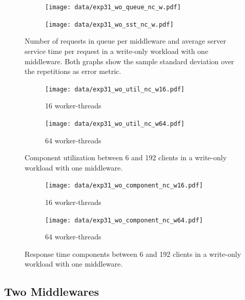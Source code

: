 \documentclass[11pt,a4paper]{article}
\begin{document}
\begin{figure}
	\begin{subfigure}[b]{.499\linewidth}
		\centering
		\texttt{[image: data/exp31\_wo\_queue\_nc\_w.pdf]}
	\end{subfigure}\hfill
	\begin{subfigure}[b]{.499\linewidth}
		\centering
		\texttt{[image: data/exp31\_wo\_sst\_nc\_w.pdf]}
	\end{subfigure}\hfill
	\caption{Number of requests in queue per middleware and average server service time per request in a write-only workload with one middleware. Both graphs show the sample standard deviation over the repetitions as error metric.}\label{exp31_wo_queue_sst_nc}
\end{figure}

\begin{figure}
	\begin{subfigure}[b]{.499\linewidth}
		\centering
		\texttt{[image: data/exp31\_wo\_util\_nc\_w16.pdf]}
		\caption{16 worker-threads}
	\end{subfigure}\hfill
	\begin{subfigure}[b]{.499\linewidth}
		\centering
		\texttt{[image: data/exp31\_wo\_util\_nc\_w64.pdf]}
		\caption{64 worker-threads}
	\end{subfigure}\hfill
	\caption{Component utilization between 6 and 192 clients in a write-only workload with one middleware.}
\end{figure}

\begin{figure}
	\begin{subfigure}[b]{.499\linewidth}
		\centering
		\texttt{[image: data/exp31\_wo\_component\_nc\_w16.pdf]}
		\caption{16 worker-threads}
	\end{subfigure}\hfill
	\begin{subfigure}[b]{.499\linewidth}
		\centering
		\texttt{[image: data/exp31\_wo\_component\_nc\_w64.pdf]}
		\caption{64 worker-threads}
	\end{subfigure}\hfill
	\caption{Response time components between 6 and 192 clients in a write-only workload with one middleware.}
\end{figure}




\subsection{Two Middlewares}\label{exp32}

\end{document}
